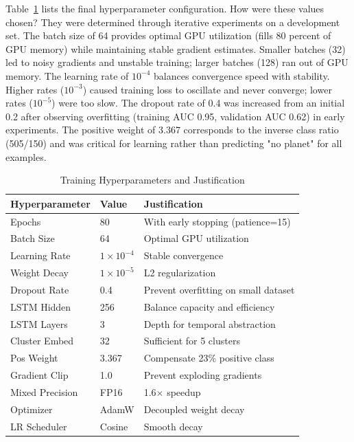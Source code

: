 \documentclass[letterpaper]{article} %
\begin{document}
Table~\ref{tab:bilstm_hyperparams} lists the final hyperparameter configuration. How were these values chosen? They were determined through iterative experiments on a development set. The batch size of 64 provides optimal GPU utilization (fills 80 percent of GPU memory) while maintaining stable gradient estimates. Smaller batches (32) led to noisy gradients and unstable training; larger batches (128) ran out of GPU memory. The learning rate of $10^{-4}$ balances convergence speed with stability. Higher rates ($10^{-3}$) caused training loss to oscillate and never converge; lower rates ($10^{-5}$) were too slow. The dropout rate of 0.4 was increased from an initial 0.2 after observing overfitting (training AUC 0.95, validation AUC 0.62) in early experiments. The positive weight of 3.367 corresponds to the inverse class ratio (505/150) and was critical for learning rather than predicting "no planet" for all examples.

\begin{table}[h]
\centering
\caption{Training Hyperparameters and Justification}
\label{tab:bilstm_hyperparams}
\begin{tabular}{@{}llp{3.5cm}@{}}
\toprule
\textbf{Hyperparameter} & \textbf{Value} & \textbf{Justification} \\
\midrule
Epochs & 80 & With early stopping (patience=15) \\
Batch Size & 64 & Optimal GPU utilization \\
Learning Rate & $1 \times 10^{-4}$ & Stable convergence \\
Weight Decay & $1 \times 10^{-5}$ & L2 regularization \\
Dropout Rate & 0.4 & Prevent overfitting on small dataset \\
LSTM Hidden & 256 & Balance capacity and efficiency \\
LSTM Layers & 3 & Depth for temporal abstraction \\
Cluster Embed & 32 & Sufficient for 5 clusters \\
Pos Weight & 3.367 & Compensate 23\% positive class \\
Gradient Clip & 1.0 & Prevent exploding gradients \\
Mixed Precision & FP16 & 1.6$\times$ speedup \\
Optimizer & AdamW & Decoupled weight decay \\
LR Scheduler & Cosine & Smooth decay \\
\bottomrule
\end{tabular}
\end{table}
\end{document}
